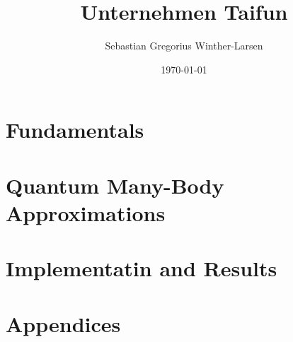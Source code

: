 \documentclass[twoside, english, notitlepage, 10pt]{uiofysmaster}
\author{Sebastian Gregorius Winther-Larsen}
\title{Unternehmen Taifun}
\date{\today}
\begin{document}
\frontmatter
    \maketitle

    \setcounter{tocdepth}{1}
    \tableofcontents
    \listoffigures

\mainmatter

    \part{Fundamentals}

        
        

    \part{Quantum Many-Body Approximations}

        
        
        

    \part{Implementatin and Results}

        
         
        
        
        

    \part{Appendices}
    \appendix

        
        
        
        

    \printbibliography
\end{document}
